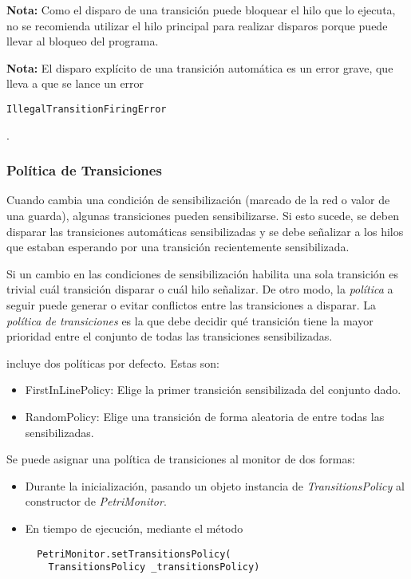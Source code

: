 \begin{framed}
\textbf{Nota:} Como el disparo de una transición puede bloquear el hilo que lo
ejecuta, no se recomienda utilizar el hilo principal para realizar disparos
porque puede llevar al bloqueo del programa.
\end{framed}

\begin{framed}
\textbf{Nota:} El disparo explícito de una transición automática es un error
grave, que lleva a que se lance un error
\begin{verbatim} 
IllegalTransitionFiringError
\end{verbatim}
.
\end{framed}

\subsubsection{Política de Transiciones}

Cuando cambia una condición de sensibilización (marcado de la red o valor de
una guarda), algunas transiciones pueden sensibilizarse. Si esto sucede, se
deben disparar las transiciones automáticas sensibilizadas y se debe señalizar a
los hilos que estaban esperando por una transición recientemente sensibilizada.

Si un cambio en las condiciones de sensibilización habilita una sola
transición es trivial cuál transición disparar o cuál hilo señalizar. De otro
modo, la \textit{política} a seguir puede generar o evitar conflictos entre las
transiciones a disparar.
La \textit{política de transiciones} es la que debe decidir qué transición tiene
la mayor prioridad entre el conjunto de todas las transiciones sensibilizadas.

\javapetriconcurrencymonitor incluye dos políticas por defecto. Estas son:
\begin{itemize}
    \item FirstInLinePolicy: Elige la primer transición sensibilizada del
    conjunto dado.
    \item RandomPolicy: Elige una transición de forma aleatoria de entre todas
    las sensibilizadas.
\end{itemize}

Se puede asignar una política de transiciones al monitor de dos formas:

\begin{itemize}
    \item Durante la inicialización, pasando un objeto instancia de
    \textit{TransitionsPolicy} al constructor de \textit{PetriMonitor}.
    \item En tiempo de ejecución, mediante el método\\ {
    \begin{verbatim}
  PetriMonitor.setTransitionsPolicy(
    TransitionsPolicy _transitionsPolicy)
    \end{verbatim}
    }
\end{itemize}

